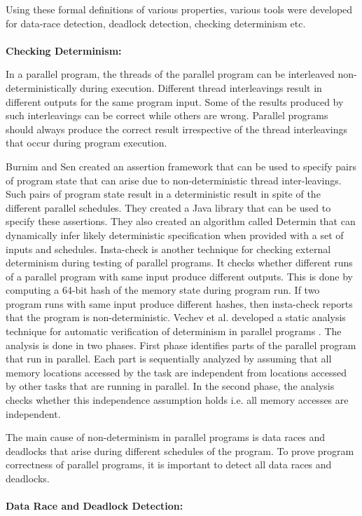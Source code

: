 Using these formal definitions of various properties, various tools were developed for data-race detection, deadlock detection, checking determinism etc.\\
\\
\textbf{Checking Determinism: }

In a parallel program, the threads of the parallel program can be interleaved non-deterministically during execution. Different thread interleavings result in different outputs for the same program input. Some of the results produced by such interleavings can be correct while others are wrong. Parallel programs should always produce the correct result irrespective of the thread interleavings that occur during program execution.

Burnim and Sen created an assertion framework that can be used to specify pairs of program state that can arise due to non-deterministic thread inter-leavings\cite{burnim2009asserting}. Such pairs of program state result in a deterministic result in spite of the different parallel schedules. They created a Java library that can be used to specify these assertions. They also created an algorithm called Determin \cite{burnim2010determin} that can dynamically infer likely deterministic specification when provided with a set of inputs and schedules. Insta-check \cite{nistor2010instantcheck} is another technique for checking external determinism during testing of parallel programs. It checks whether different runs of a parallel program with same input produce different outputs. This is done by computing a 64-bit hash of the memory state during program run. If two program runs with same input produce different hashes, then insta-check reports that the program is non-deterministic. Vechev et al. developed a static analysis technique for automatic verification of determinism in parallel programs \cite{vechev2011automatic}. The analysis is done in two phases. First phase identifies parts of the parallel program that run in parallel. Each part is sequentially analyzed by assuming that all memory locations accessed by the task are independent from locations accessed by other tasks that are running in parallel. In the second phase, the analysis checks whether this independence assumption holds i.e. all memory accesses are independent.

The main cause of non-determinism in parallel programs is data races and deadlocks that arise during different schedules of the program. To prove program correctness of parallel programs, it is important to detect all data races and deadlocks.
\\
\\
\textbf{Data Race and Deadlock Detection: }

